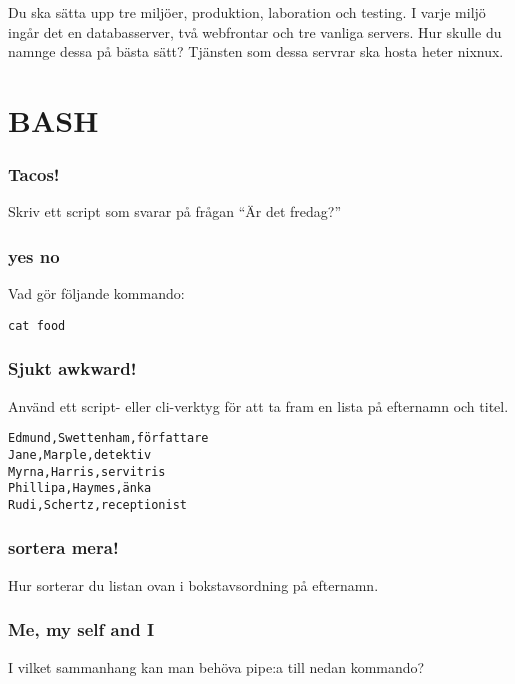 Du ska sätta upp tre miljöer, produktion, laboration och testing. I
varje miljö ingår det en databasserver, två webfrontar och tre vanliga
servers. Hur skulle du namnge dessa på bästa sätt? Tjänsten som dessa
servrar ska hosta heter nixnux.

\section{BASH}\label{bash}

\subsubsection{Tacos!}\label{tacos}

Skriv ett script som svarar på frågan ``Är det fredag?''

\subsubsection{yes no}\label{yes-no}

Vad gör följande kommando:

\begin{verbatim}
cat food
\end{verbatim}

\subsubsection{Sjukt awkward!}\label{sjukt-awkward}

Använd ett script- eller cli-verktyg för att ta fram en lista på
efternamn och titel.

\begin{verbatim}
Edmund,Swettenham,författare
Jane,Marple,detektiv
Myrna,Harris,servitris
Phillipa,Haymes,änka
Rudi,Schertz,receptionist
\end{verbatim}

\subsubsection{sortera mera!}\label{sortera-mera}

Hur sorterar du listan ovan i bokstavsordning på efternamn.

\subsubsection{Me, my self and I}\label{me-my-self-and-i}

I vilket sammanhang kan man behöva pipe:a till nedan kommando?

